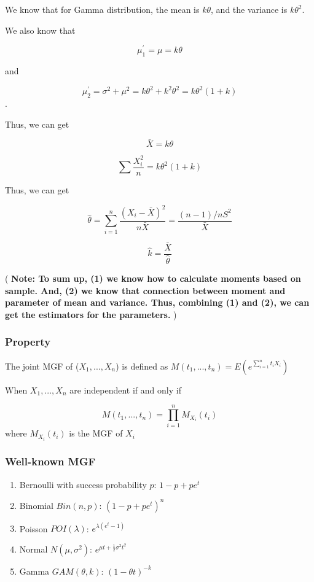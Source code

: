 \documentclass[]{book}
\begin{document}
We know that for Gamma distribution, the mean is \(k\theta\), and the variance is \(k\theta^2\).

We also know that

\[\mu_1^{'}=\mu=k\theta\]

and

\[\mu_2^{'}= \sigma^2+\mu^2= k\theta^2+k^2\theta^2=k\theta^2(1+k)\].

Thus, we can get

\[\bar{X}=k\theta\]

\[\sum \frac{X_i^2}{n}=k\theta^2(1+k)\]

Thus, we can get

\[\hat{\theta}=\sum_{i=1}^n \frac{(X_i-\bar{X})^2}{n \bar{X}}=\frac{(n-1)/n S^2}{\bar{X}}\]

\[\hat{k}=\frac{\bar{X}}{\hat{\theta}}\]

( \textbf{Note: To sum up, (1) we know how to calculate moments based on sample. And, (2) we know that connection between moment and parameter of mean and variance. Thus, combining (1) and (2), we can get the estimators for the parameters.} )

\hypertarget{property}{%
\subsubsection{Property}\label{property}}

The joint MGF of (\(X_1, ..., X_n\)) is defined as \(M(t_1,...,t_n)=E(e^{\sum_{i=1}^nt_iX_i})\)

When \(X_1, ..., X_n\) are independent if and only if

\[M(t_1,...,t_n)=\prod_{i=1}^n M_{X_i}(t_i)\]
where \(M_{X_i}(t_i)\) is the MGF of \(X_i\)

\hypertarget{well-known-mgf}{%
\subsubsection{Well-known MGF}\label{well-known-mgf}}

\begin{enumerate}
\def\labelenumi{(\arabic{enumi})}
\item
  Bernoulli with success probability \(p\): \(1-p+pe^t\)
\item
  Binomial \(Bin(n,p)\): \((1-p+pe^t)^n\)
\item
  Poisson \(POI(\lambda)\): \(e^{\lambda(e^t-1)}\)
\item
  Normal \(N(\mu,\sigma^2)\): \(e^{\mu t+\frac{1}{2}\sigma^2t^2}\)
\item
  Gamma \(GAM(\theta,k)\): \((1-\theta t)^{-k}\)
\end{enumerate}
\end{document}
